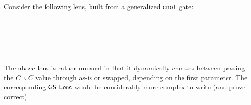 \documentclass[sigplan,review,anonymous]{acmart}
\begin{document}
Consider the following lens, built from a generalized \texttt{cnot} gate:
\begin{code}%
%
\>[2]\AgdaSpace{}%
\AgdaSymbol{:}\AgdaSpace{}%
\AgdaSymbol{\{}\AgdaSpace{}%
\AgdaSpace{}%
\AgdaSpace{}%
\AgdaSymbol{:}\AgdaSpace{}%
\AgdaSymbol{\}}\AgdaSpace{}%
\AgdaSpace{}%
\AgdaSymbol{((}\AgdaSpace{}%
\AgdaSpace{}%
\AgdaSymbol{)}\AgdaSpace{}%
\AgdaSpace{}%
\AgdaSymbol{(}\AgdaSpace{}%
\AgdaSpace{}%
\AgdaSymbol{))}\AgdaSpace{}%
\AgdaSpace{}%
\AgdaSymbol{((}\AgdaSpace{}%
\AgdaSpace{}%
\AgdaSymbol{)}\AgdaSpace{}%
\AgdaSpace{}%
\AgdaSymbol{(}\AgdaSpace{}%
\AgdaSpace{}%
\AgdaSymbol{))}\<%
\\
%
\>[2]\AgdaSpace{}%
\AgdaSymbol{=}\AgdaSpace{}%
\AgdaSpace{}%
\AgdaSpace{}%
\AgdaSpace{}%
\AgdaSpace{}%
\AgdaSymbol{(}\AgdaSpace{}%
\AgdaSpace{}%
\AgdaSymbol{)}\AgdaSpace{}%
\AgdaSpace{}%
\<%
\\
%
\\[\AgdaEmptyExtraSkip]%
%
\>[2]\AgdaSpace{}%
\AgdaSymbol{:}\AgdaSpace{}%
\AgdaSymbol{\{}\AgdaSpace{}%
\AgdaSpace{}%
\AgdaSpace{}%
\AgdaSymbol{:}\AgdaSpace{}%
\AgdaSymbol{\}}\AgdaSpace{}%
\AgdaSpace{}%
\AgdaSpace{}%
\AgdaSymbol{((}\AgdaSpace{}%
\AgdaSpace{}%
\AgdaSymbol{)}\AgdaSpace{}%
\AgdaSpace{}%
\AgdaSymbol{(}\AgdaSpace{}%
\AgdaSpace{}%
\AgdaSymbol{))}%
\>[59]\AgdaSymbol{(}\AgdaSpace{}%
\AgdaSpace{}%
\AgdaSymbol{)}\<%
\\
%
\>[2]\AgdaSpace{}%
\AgdaSymbol{\{}\AgdaSymbol{\}}\AgdaSpace{}%
\AgdaSymbol{\{}\AgdaSymbol{\}}\AgdaSpace{}%
\AgdaSymbol{=}\AgdaSpace{}%
\AgdaSpace{}%
\<%
\end{code}
The above lens is rather unusual in that it dynamically chooses between
passing the $C ⊎ C$ value through as-is or swapped, depending on the first
parameter. The corresponding $\AgdaRecord{GS-Lens}$ would be considerably
more complex to write (and prove correct).
\end{document}
